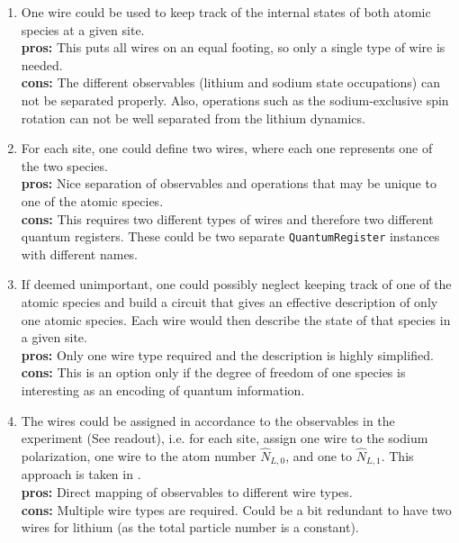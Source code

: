 \documentclass[a4paper, 10pt]{article}
\begin{document}
    \begin{enumerate}
        \item One wire could be used to keep track of the internal states of both atomic species at a given site. \\
        \textbf{pros:} This puts all wires on an equal footing, so only a single type of wire is needed. \\
        \textbf{cons:} The different observables (lithium and sodium state occupations) can not be separated properly.
        Also, operations such as the sodium-exclusive spin rotation can not be well separated from the lithium dynamics.
            
        \item For each site, one could define two wires, where each one represents one of the two species. \\
        \textbf{pros:} Nice separation of observables and operations that may be unique to one of the atomic species. \\
        \textbf{cons:} This requires two different types of wires and therefore two different quantum registers.
        These could be two separate \texttt{QuantumRegister} instances with different names.
            
        \item If deemed unimportant, one could possibly neglect keeping track of one of the atomic species and build a circuit that gives an effective description of only one atomic species.
        Each wire would then describe the state of that species in a given site.\\
        \textbf{pros:} Only one wire type required and the description is highly simplified.\\
        \textbf{cons:} This is an option only if the degree of freedom of one species is interesting as an encoding of quantum information.
            
        \item The wires could be assigned in accordance to the observables in the experiment (See readout), i.e. for each site, assign one wire to the sodium polarization, one wire to the atom number $\hat{N}_{L, 0}$, and one to $\hat{N}_{L, 1}$.
        This approach is taken in \cite{Jendrzejewski_2020}. \\
        \textbf{pros:} Direct mapping of observables to different wire types. \\
        \textbf{cons:} Multiple wire types are required.
        Could be a bit redundant to have two wires for lithium (as the total particle number is a constant). 
    \end{enumerate}
        
\end{document}
